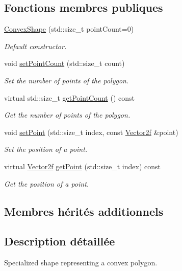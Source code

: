 \subsection*{Fonctions membres publiques}
\begin{DoxyCompactItemize}
\item 
\hyperlink{classsf_1_1ConvexShape_af9981b8909569b381b3fccf32fc69856}{Convex\+Shape} (std\+::size\+\_\+t point\+Count=0)
\begin{DoxyCompactList}\small\item\em Default constructor. \end{DoxyCompactList}\item 
void \hyperlink{classsf_1_1ConvexShape_a56e6e79ade6dd651cc1a0e39cb68deae}{set\+Point\+Count} (std\+::size\+\_\+t count)
\begin{DoxyCompactList}\small\item\em Set the number of points of the polygon. \end{DoxyCompactList}\item 
virtual std\+::size\+\_\+t \hyperlink{classsf_1_1ConvexShape_a0c54b8d48fe4e13414f6e667dbfc22a3}{get\+Point\+Count} () const
\begin{DoxyCompactList}\small\item\em Get the number of points of the polygon. \end{DoxyCompactList}\item 
void \hyperlink{classsf_1_1ConvexShape_a5929e0ab0ba5ca1f102b40c234a8e92d}{set\+Point} (std\+::size\+\_\+t index, const \hyperlink{classsf_1_1Vector2}{Vector2f} \&point)
\begin{DoxyCompactList}\small\item\em Set the position of a point. \end{DoxyCompactList}\item 
virtual \hyperlink{classsf_1_1Vector2}{Vector2f} \hyperlink{classsf_1_1ConvexShape_a72a97bc426d8daf4d682a20fcb7f3fe7}{get\+Point} (std\+::size\+\_\+t index) const
\begin{DoxyCompactList}\small\item\em Get the position of a point. \end{DoxyCompactList}\end{DoxyCompactItemize}
\subsection*{Membres hérités additionnels}


\subsection{Description détaillée}
Specialized shape representing a convex polygon. 


